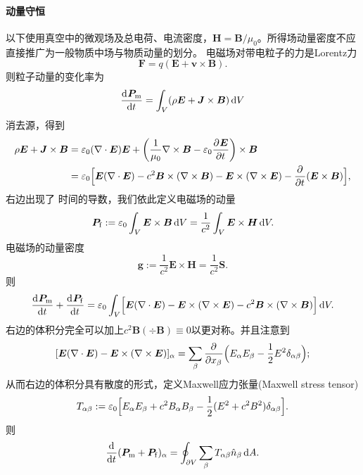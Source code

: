 \paragraph{动量守恒}
以下使用真空中的微观场及总电荷、电流密度，$\bm H = \bm B/\mu_0$。所得场动量密度不应直接推广为一般物质中场与物质动量的划分。
电磁场对带电粒子的力是Lorentz力
\[
    \bm F = q(\bm E + \bm v \times \bm B).
\]
则粒子动量的变化率为
\[
    \frac{\mathop{}\!\mathrm{d}^{}\bm P_{\mathrm{m}}}{\mathrm{d}{t}^{}} = \int_V(\rho\bm E + \bm J \times \bm B)\mathop{}\!\mathrm{d} V
\]
消去源，得到
\begin{align*}
    \rho\bm E + \bm J \times \bm B &= \varepsilon_0(\nabla\cdot\bm E)\bm E + \biggl(\frac1{\mu_0}\nabla\times\bm B - \varepsilon_0\frac{\partial^{}\bm E}{\partial{t}^{}}\biggr) \times \bm B\\
    &= \varepsilon_0\Bigl[\bm E(\nabla\cdot\bm E) - c^2\bm B \times (\nabla\times\bm B) - \bm E \times (\nabla\times\bm E) - \frac{\partial^{}}{\partial{t}^{}}(\bm E \times \bm B)\Bigr],
\end{align*}
右边出现了%
时间的导数，我们依此定义电磁场的动量
\begin{equation}
    \label{eq:ed-vacuum-field-momentum}
    \bm P_{\mathrm{f}} := \varepsilon_0\int_V\bm E \times \bm B\mathop{}\!\mathrm{d} V = \frac1{c^2}\int_V\bm E \times \bm H\mathop{}\!\mathrm{d} V.
\end{equation}
电磁场的动量密度
\begin{equation}
    \label{eq:ed-vacuum-momentum-density}
    \bm g := \frac1{c^2}\bm E \times \bm H = \frac1{c^2}\bm S.
\end{equation}
则
\[
    \frac{\mathop{}\!\mathrm{d}^{}\bm P_{\mathrm{m}}}{\mathrm{d}{t}^{}} + \frac{\mathop{}\!\mathrm{d}^{}\bm P_{\mathrm{f}}}{\mathrm{d}{t}^{}} = \varepsilon_0\int_V\Bigl[\bm E(\nabla\cdot\bm E) - \bm E \times (\nabla\times\bm E) - c^2\bm B \times (\nabla\times\bm B)\Bigr]\mathop{}\!\mathrm{d} V.
\]
右边的体积分完全可以加上$c^2\bm B(\div\bm B) \equiv 0$以更对称。并且注意到
\[
    [\bm E(\nabla\cdot\bm E) - \bm E \times (\nabla\times\bm E)]_\alpha = \sum_\beta\frac{\partial^{}}{\partial{x_\beta}^{}}\Bigl(E_\alpha E_\beta - \frac12E^2\delta_{\alpha\beta}\Bigr);
\]
从而右边的体积分具有散度的形式，定义Maxwell应力张量(Maxwell stress tensor)
\begin{equation}
    \label{eqn:vacuum maxwell stress}
    T_{\alpha\beta} := \varepsilon_0\Bigl[E_\alpha E_\beta + c^2B_\alpha B_\beta - \frac12(E^2 + c^2B^2)\delta_{\alpha\beta}\Bigr].
\end{equation}
则
\begin{equation}
    \label{eq:ed-integral-momentum-balance}
    \frac{\mathop{}\!\mathrm{d}^{}}{\mathrm{d}{t}^{}}({\bm P_{\mathrm{m}}} + {\bm P_{\mathrm{f}}})_\alpha = \oint_{\partial V}\sum_\beta T_{\alpha\beta}\hat n_\beta\mathop{}\!\mathrm{d} A.
\end{equation}
